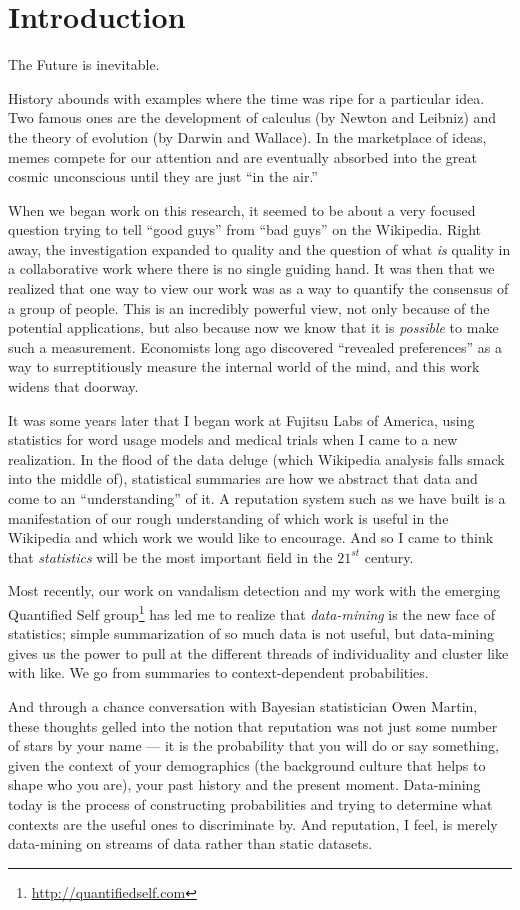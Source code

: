\section{Introduction}

The Future is inevitable.

History abounds with examples where the time was ripe for a particular idea.
Two famous ones are the development of calculus (by Newton and Leibniz)
and the theory of evolution (by Darwin and Wallace).
In the marketplace of ideas, memes compete for our attention and
are eventually absorbed into the great cosmic unconscious until
they are just ``in the air.''

When we began work on this research, it seemed to be about a very focused
question trying to tell ``good guys'' from ``bad guys'' on the Wikipedia.
Right away, the investigation expanded to quality and the question of what
\textit{is} quality in a collaborative work where there is no single
guiding hand.
It was then that we realized that one way to view our work was as a
way to quantify the consensus of a group of people.
This is an incredibly powerful view, not only because of the potential
applications, but also because now we know that it is \textit{possible}
to make such a measurement.
Economists long ago discovered ``revealed preferences''
as a way to surreptitiously measure the internal world of the mind,
and this work widens that doorway.

It was some years later that I began work at Fujitsu Labs of America,
using statistics for word usage models and medical trials when I came to
a new realization.
In the flood of the data deluge (which Wikipedia analysis falls smack
into the middle of), statistical summaries are how we abstract that data
and come to an ``understanding'' of it.
A reputation system such as we have built is a manifestation of our
rough understanding of which work is useful in the Wikipedia and
which work we would like to encourage.
And so I came to think that \textit{statistics} will be the
most important field in the $21^{st}$ century.

Most recently, our work on vandalism detection and my work with the
emerging Quantified Self group\footnote{\url{http://quantifiedself.com}}
has led me to realize that
\textit{data-mining} is the new face of statistics; simple summarization
of so much data is not useful, but data-mining gives us the power to
pull at the different threads of individuality and cluster like with like.
We go from summaries to context-dependent probabilities.

And through a chance conversation with Bayesian statistician
Owen Martin, these thoughts gelled into the notion that reputation
was not just some number of stars by your name --- it is the probability
that you will do or say something, given the context of your demographics
(\ie the background culture that helps to shape who you are),
your past history and the present moment.
Data-mining today is the process of constructing probabilities and
trying to determine what contexts are the useful ones to discriminate by.
And reputation, I feel, is merely data-mining on streams of data
rather than static datasets.

